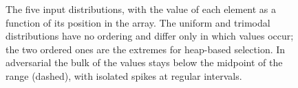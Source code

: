 \begin{figure}[H]
    \caption[The five input distributions]{The five input distributions, with the value of each element as a
    function of its position in the array. The uniform and trimodal distributions
    have no ordering and differ only in which values occur; the two ordered ones
    are the extremes for heap-based selection. In adversarial the bulk of the
    values stays below the midpoint of the range (dashed), with isolated spikes
    at regular intervals.}
    \label{fig:meth-dists}
\end{figure}
